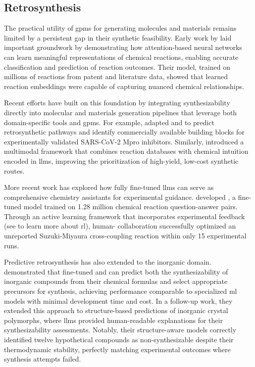 \subsection{Retrosynthesis}\label{sec:retrosynthesis}

The practical utility of \glspl{gpm} for generating molecules and materials remains limited by a persistent gap in their synthetic feasibility. Early work by \textcite{schwaller2021mapping} laid important groundwork by demonstrating how attention-based neural networks can learn meaningful representations of chemical reactions, enabling accurate classification and prediction of reaction outcomes. Their model, trained on millions of reactions from patent and literature data, showed that learned reaction embeddings were capable of capturing nuanced chemical relationships. 

Recent efforts have built on this foundation by integrating synthesizability directly into molecular and materials generation pipelines that leverage both domain-specific tools and \glspl{gpm}. For example, \textcite{sun2025synllama} adapted  and  to predict retrosynthetic pathways and identify commercially available building blocks for experimentally validated SARS-CoV-2 Mpro inhibitors. 
Similarly, \textcite{liu2024multimodal} introduced a multimodal framework that combines reaction databases with chemical intuition encoded in \glspl{llm}, improving the prioritization of high-yield, low-cost synthetic routes.

More recent work has explored how fully fine-tuned \glspl{llm} can serve as comprehensive chemistry assistants for experimental guidance. \textcite{zhang2025large} developed , a fine-tuned  model trained on 1.28 million chemical reaction question-answer pairs. Through an active learning framework that incorporates experimental feedback (see  to learn more about \gls{rl}), human- collaboration successfully optimized an unreported Suzuki-Miyaura cross-coupling reaction within only 15 experimental runs.

Predictive retrosynthesis has also extended to the inorganic domain. \textcite{kim2024large} demonstrated that fine-tuned  and  can predict both the synthesizability of inorganic compounds from their chemical formulas and select appropriate precursors for synthesis, achieving performance comparable to specialized \gls{ml} models with minimal development time and cost. 
In a follow-up work, they extended this approach to structure-based predictions of inorganic crystal polymorphs, where \glspl{llm} provided human-readable explanations for their synthesizability assessments\autocite{kim2025explainable}. 
Notably, their structure-aware models correctly identified twelve hypothetical compounds as non-synthesizable despite their thermodynamic stability, perfectly matching experimental outcomes where synthesis attempts failed.

